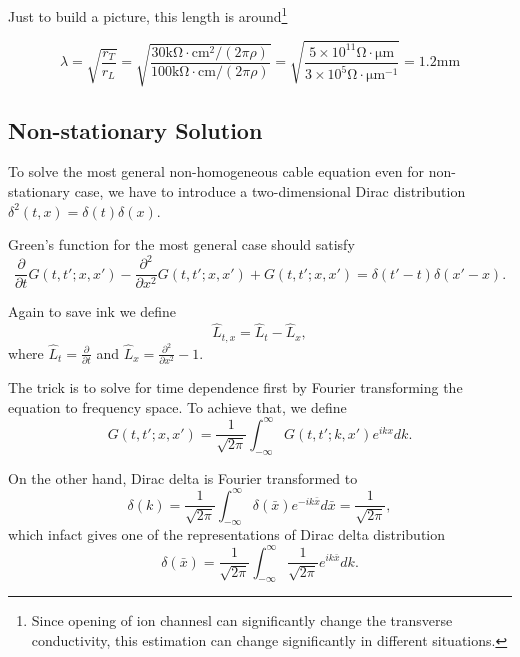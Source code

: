 Just to build a picture, this length is around\footnote{Since opening of ion channesl can significantly change the transverse conductivity, this estimation can change significantly in different situations.}

\begin{equation*}
    \lambda = \sqrt{ \frac{r_T}{r_L}} = \sqrt{ \frac{30\mathrm{k\Omega\cdot cm^2}/(2\pi \rho)}{ 100 \mathrm{k\Omega\cdot cm}/(2\pi \rho) } } = \sqrt{ \frac{5\times 10^{11} \mathrm{\Omega \cdot \mu m} }{ 3\times 10^{5} \mathrm{\Omega \cdot \mu m^{-1}}  } } = 1.2\mathrm{mm}
\end{equation*}





\subsection{Non-stationary Solution}

To solve the most general non-homogeneous cable equation even for non-stationary case, we have to introduce a two-dimensional Dirac distribution $\delta^2(t,x) = \delta(t)\delta(x)$.

Green's function for the most general case should satisfy\cite{Gerstner2002}
\begin{equation}
    \frac{\partial}{\partial t} G(t,t';x,x') - \frac{\partial^2}{\partial x^2}  G(t,t';x,x') +  G(t,t';x,x') = \delta(t'-t)\delta(x'-x).
\end{equation}

Again to save ink we define
\begin{equation*}
    \hat L_{t,x} = \hat L_t - \hat L_x,
\end{equation*}
where $\hat L_t = \frac{\partial}{\partial t}$ and $\hat L_x = \frac{\partial^2}{\partial x^2} - 1$.

The trick is to solve for time dependence first by Fourier transforming the equation to frequency space. To achieve that, we define
\begin{equation}
    G(t,t';x,x') = \frac{1}{\sqrt{2\pi}}\int_{-\infty}^\infty G(t,t';k,x')e^{ikx}dk.\label{eqn-green-function-fourier-transform}
\end{equation}

On the other hand, Dirac delta is Fourier transformed to
\begin{equation}
\delta(k) = \frac{1}{\sqrt{2\pi}} \int_{-\infty}^\infty \delta(\bar x) e^{- ik \bar x} d\bar x = \frac{1}{\sqrt{2\pi}} ,
    \label{eqn-dirac-delta-fourier-transform}
\end{equation}
which infact gives one of the representations of Dirac delta distribution
\begin{equation}
    \delta(\bar x) = \frac{1}{\sqrt{2\pi}}\int_{-\infty}^\infty \frac{1}{\sqrt{2\pi}} e^{ik \bar x} dk .
\end{equation}

